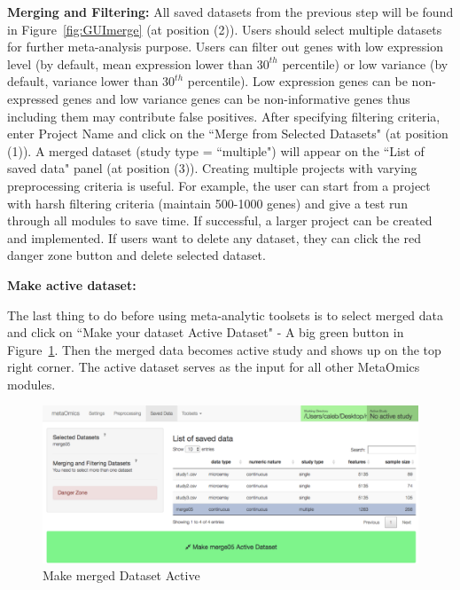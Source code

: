 \begin{steps}
\item \textbf{Merging and Filtering:}
All saved datasets from the previous step will be found in  Figure~\ref{fig:GUImerge} (at position {\color{red} (2)}).
Users should select multiple datasets for further meta-analysis purpose.
Users can filter out genes with low expression level (by default, mean expression lower than $30^{th}$ percentile)
or low variance (by default, variance lower than $30^{th}$ percentile).
Low expression genes can be non-expressed genes and low variance genes can be non-informative genes thus including them may contribute false positives.
After specifying filtering criteria, enter Project Name and click on the ``Merge from Selected Datasets" (at position {\color{red} (1)}).
A merged dataset (study type = ``multiple") will appear on the  ``List of saved data" panel (at position {\color{red} (3)}).
Creating multiple projects with varying preprocessing criteria is useful.
For example, the user can start from a project with harsh filtering criteria (maintain 500-1000 genes) and give a test run through all modules to save time.
If successful, a larger project can be created and implemented.
If users want to delete any dataset, they can click the red danger zone button and delete selected dataset.

\item \textbf{Make active dataset:}

The last thing to do before using meta-analytic toolsets is to select merged data and click on 
``Make your dataset Active Dataset" - A big green button in Figure~\ref{fig:active}.
Then the merged data becomes active study and shows up on the top right corner.
The active dataset serves as the input for all other MetaOmics modules.


\end{steps}







\begin{figure}[H]
\begin{center}
\includegraphics[scale=0.4]{./figure/preprocessing/GUImarkActive}
\caption{Make merged Dataset Active}
\label{fig:active}
\end{center}
\end{figure}




